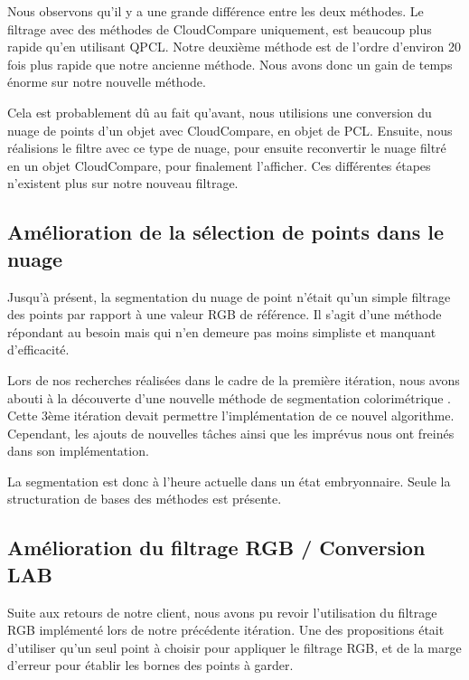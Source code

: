 \documentclass[12pt,titlepage,french]{article}
\begin{document}
Nous observons qu'il y a une grande différence entre les deux méthodes. Le filtrage avec des méthodes de CloudCompare uniquement, est beaucoup plus rapide qu'en utilisant QPCL. Notre deuxième méthode est de l'ordre d'environ 20 fois plus rapide que notre ancienne méthode. Nous avons donc un gain de temps énorme sur notre nouvelle méthode. \newline

Cela est probablement dû au fait qu'avant, nous utilisions une conversion du nuage de points d'un objet avec CloudCompare, en objet de PCL. Ensuite, nous réalisions le filtre avec ce type de nuage, pour ensuite reconvertir le nuage filtré en un objet CloudCompare, pour finalement l'afficher. Ces différentes étapes n'existent plus sur notre nouveau filtrage.

\subsection{Amélioration de la sélection de points dans le nuage}
Jusqu'à présent, la segmentation du nuage de point n'était qu'un simple filtrage des points par rapport à une valeur RGB de référence. Il s'agit d'une méthode répondant au besoin mais qui n'en demeure pas moins simpliste et manquant d'efficacité. \newline

Lors de nos recherches réalisées dans le cadre de la première itération, nous avons abouti à la découverte d'une nouvelle méthode de segmentation colorimétrique \cite{B01}. Cette 3ème itération devait permettre l'implémentation de ce nouvel algorithme. Cependant, les ajouts de nouvelles tâches ainsi que les imprévus nous ont freinés dans son implémentation. \newline

La segmentation est donc à l'heure actuelle dans un état embryonnaire. Seule la structuration de bases des méthodes est présente.

\subsection{Amélioration du filtrage RGB / Conversion LAB}

Suite aux retours de notre client, nous avons pu revoir l'utilisation du filtrage RGB implémenté lors de notre précédente itération. Une des propositions était d'utiliser qu'un seul point à choisir pour appliquer le filtrage RGB, et de la marge d'erreur pour établir les bornes des points à garder.
\end{document}
